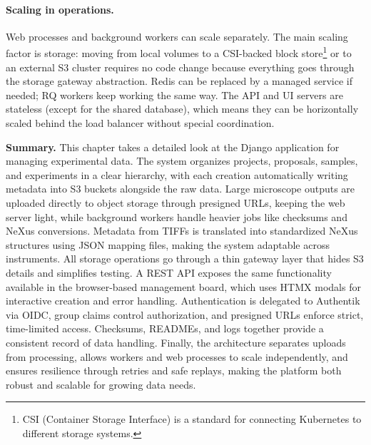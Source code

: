 \paragraph{Scaling in operations.}
Web processes and background workers can scale separately.  
The main scaling factor is storage: moving from local volumes to a CSI-backed block store\footnote{CSI (Container Storage Interface) is a standard for connecting Kubernetes to different storage systems.} or to an external S3 cluster requires no code change because everything goes through the storage gateway abstraction.  
Redis can be replaced by a managed service if needed; RQ workers keep working the same way.  
The API and UI servers are stateless (except for the shared database), which means they can be horizontally scaled behind the load balancer without special coordination.


\bigskip

\noindent\textbf{Summary.}
This chapter takes a detailed look at the Django application for managing experimental data. The system organizes projects, proposals, samples, and experiments in a clear hierarchy, with each creation automatically writing metadata into S3 buckets alongside the raw data. Large microscope outputs are uploaded directly to object storage through presigned URLs, keeping the web server light, while background workers handle heavier jobs like checksums and NeXus conversions. Metadata from TIFFs is translated into standardized NeXus structures using JSON mapping files, making the system adaptable across instruments. All storage operations go through a thin gateway layer that hides S3 details and simplifies testing. A REST API exposes the same functionality available in the browser-based management board, which uses HTMX modals for interactive creation and error handling. Authentication is delegated to Authentik via OIDC, group claims control authorization, and presigned URLs enforce strict, time-limited access. Checksums, READMEs, and logs together provide a consistent record of data handling. Finally, the architecture separates uploads from processing, allows workers and web processes to scale independently, and ensures resilience through retries and safe replays, making the platform both robust and scalable for growing data needs.
